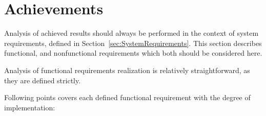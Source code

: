 

%


\section{Achievements}

\label{sec:achievements}

Analysis of achieved results should always be performed in the context of system requirements, defined in Section~\ref{sec:SystemRequirements}. This section describes functional, and nonfunctional requirements which both should be considered here.

Analysis of functional requirements realization is relatively straightforward, as they are defined strictly.

Following points covers each defined functional requirement with the degree of implementation:

